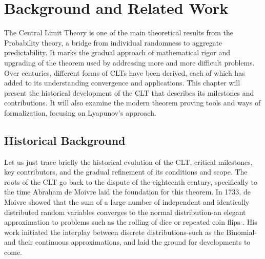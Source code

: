 \chapter[Background and Related Work]{Background and Related Work}
\label{chap:2}

    

The Central Limit Theory is one of the main theoretical results from the  Probability theory, a bridge from individual randomness to aggregate predictability. It marks the gradual approach of mathematical rigor and upgrading of the theorem used by addressing more and more difficult problems. Over centuries, different forms of CLTs have been derived, each of which has added to its understanding convergence and applications. This chapter will present the historical development of the CLT that describes its milestones and contributions. It will also examine the modern theorem proving tools and ways of formalization, focusing on Lyapunov's approach.

\section{Historical Background}
Let us just trace briefly the historical evolution of the CLT, critical milestones, key contributors, and the gradual refinement of its conditions and scope. The roots of the CLT go back to the dispute of the eighteenth century, specifically to the time Abraham de Moivre laid the foundation for this theorem. In 1733, de Moivre showed that the sum of a large number of independent and identically distributed random variables converges to the normal distribution-an elegant approximation to problems such as the rolling of dice or repeated coin flips \cite{de1733approximatio}. His work initiated the interplay between discrete distributions-such as the Binomial-and their continuous approximations, and laid the ground for developments to come.

